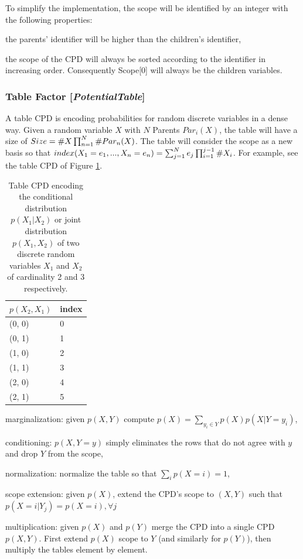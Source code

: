 \documentclass[11pt]{article}
\newcommand{\nllref}[1]{[\small{\textit{#1}}]}
\newcommand{\counta}[1]{\small{\#}#1}
\begin{document}
To simplify the implementation, the scope will be identified by an integer with the following properties:
\begin{compactitem}
\item the parents' identifier will be higher than the children's identifier,
\item the scope of the CPD will always be sorted according to the identifier in increasing order. Consequently Scope[0] will always be the children variables.
\end{compactitem}

\subsubsection{Table Factor \nllref{PotentialTable}}
A table CPD is encoding probabilities for random discrete variables in a dense way. Given a random variable $X$ with $N$ Parents $Par_i(X)$, the table will have a size of $Size=\counta{X}\prod_{n=1}^{N} \counta{Par_n(X)}$. The table will consider the scope as a new basis so that $index(X_1=e_1, ..., X_n=e_n)=\sum_{j=1}^N e_j \prod_{i=1}^{j-1}\counta{X_i} $. For example, see the table CPD of Figure \ref{tablecpd1}.

\begin{table}[h]
\label{tablecpd1}
\centering
\begin{tabular}{| l | l |}
\hline
$p(X_2, X_1)$ & index\\
\hline\hline
(0, 0) & 0\\
\hline
(0, 1) & 1\\
\hline
(1, 0) & 2\\
\hline
(1, 1) & 3\\
\hline
(2, 0) & 4\\
\hline
(2, 1) & 5\\
\hline
\end{tabular}
\caption{Table CPD encoding the conditional distribution $p(X_1|X_2)$ or joint distribution $p(X_1,X_2)$ of two discrete random variables $X_1$ and $X_2$ of cardinality 2 and 3 respectively.}
\end{table}


\begin{compactitem}
\item marginalization: given $p(X,Y)$ compute $p(X) = \sum_{y_i \in Y}p(X)p(X|Y=y_i)$,
\item conditioning: $p(X,Y=y)$ simply eliminates the rows that do not agree with $y$ and drop $Y$ from the scope,
\item normalization: normalize the table so that $\sum_ip(X=i)=1$,
\item scope extension: given $p(X)$, extend the CPD's scope to $(X, Y)$ such that $p(X=i|Y_j) = p(X=i), \forall j$
\item multiplication: given $p(X)$ and $p(Y)$ merge the CPD into a single CPD $p(X,Y)$. First extend $p(X)$ scope to $Y$ (and similarly for $p(Y)$), then multiply the tables element by element.
\end{compactitem}
\end{document}
